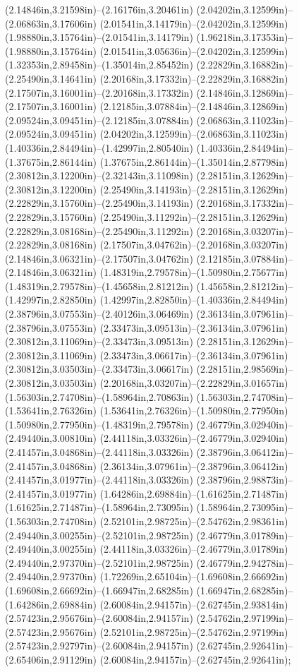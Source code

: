 (2.14846in,3.21598in)--(2.16176in,3.20461in) (2.04202in,3.12599in)--(2.06863in,3.17606in) (2.01541in,3.14179in)--(2.04202in,3.12599in) (1.98880in,3.15764in)--(2.01541in,3.14179in) (1.96218in,3.17353in)--(1.98880in,3.15764in) (2.01541in,3.05636in)--(2.04202in,3.12599in) (1.32353in,2.89458in)--(1.35014in,2.85452in) (2.22829in,3.16882in)--(2.25490in,3.14641in) (2.20168in,3.17332in)--(2.22829in,3.16882in) (2.17507in,3.16001in)--(2.20168in,3.17332in) (2.14846in,3.12869in)--(2.17507in,3.16001in) (2.12185in,3.07884in)--(2.14846in,3.12869in) (2.09524in,3.09451in)--(2.12185in,3.07884in) (2.06863in,3.11023in)--(2.09524in,3.09451in) (2.04202in,3.12599in)--(2.06863in,3.11023in) (1.40336in,2.84494in)--(1.42997in,2.80540in) (1.40336in,2.84494in)--(1.37675in,2.86144in) (1.37675in,2.86144in)--(1.35014in,2.87798in) (2.30812in,3.12200in)--(2.32143in,3.11098in) (2.28151in,3.12629in)--(2.30812in,3.12200in) (2.25490in,3.14193in)--(2.28151in,3.12629in) (2.22829in,3.15760in)--(2.25490in,3.14193in) (2.20168in,3.17332in)--(2.22829in,3.15760in) (2.25490in,3.11292in)--(2.28151in,3.12629in) (2.22829in,3.08168in)--(2.25490in,3.11292in) (2.20168in,3.03207in)--(2.22829in,3.08168in) (2.17507in,3.04762in)--(2.20168in,3.03207in) (2.14846in,3.06321in)--(2.17507in,3.04762in) (2.12185in,3.07884in)--(2.14846in,3.06321in) (1.48319in,2.79578in)--(1.50980in,2.75677in) (1.48319in,2.79578in)--(1.45658in,2.81212in) (1.45658in,2.81212in)--(1.42997in,2.82850in) (1.42997in,2.82850in)--(1.40336in,2.84494in) (2.38796in,3.07553in)--(2.40126in,3.06469in) (2.36134in,3.07961in)--(2.38796in,3.07553in) (2.33473in,3.09513in)--(2.36134in,3.07961in) (2.30812in,3.11069in)--(2.33473in,3.09513in) (2.28151in,3.12629in)--(2.30812in,3.11069in) (2.33473in,3.06617in)--(2.36134in,3.07961in) (2.30812in,3.03503in)--(2.33473in,3.06617in) (2.28151in,2.98569in)--(2.30812in,3.03503in) (2.20168in,3.03207in)--(2.22829in,3.01657in) (1.56303in,2.74708in)--(1.58964in,2.70863in) (1.56303in,2.74708in)--(1.53641in,2.76326in) (1.53641in,2.76326in)--(1.50980in,2.77950in) (1.50980in,2.77950in)--(1.48319in,2.79578in) (2.46779in,3.02940in)--(2.49440in,3.00810in) (2.44118in,3.03326in)--(2.46779in,3.02940in) (2.41457in,3.04868in)--(2.44118in,3.03326in) (2.38796in,3.06412in)--(2.41457in,3.04868in) (2.36134in,3.07961in)--(2.38796in,3.06412in) (2.41457in,3.01977in)--(2.44118in,3.03326in) (2.38796in,2.98873in)--(2.41457in,3.01977in) (1.64286in,2.69884in)--(1.61625in,2.71487in) (1.61625in,2.71487in)--(1.58964in,2.73095in) (1.58964in,2.73095in)--(1.56303in,2.74708in) (2.52101in,2.98725in)--(2.54762in,2.98361in) (2.49440in,3.00255in)--(2.52101in,2.98725in) (2.46779in,3.01789in)--(2.49440in,3.00255in) (2.44118in,3.03326in)--(2.46779in,3.01789in) (2.49440in,2.97370in)--(2.52101in,2.98725in) (2.46779in,2.94278in)--(2.49440in,2.97370in) (1.72269in,2.65104in)--(1.69608in,2.66692in) (1.69608in,2.66692in)--(1.66947in,2.68285in) (1.66947in,2.68285in)--(1.64286in,2.69884in) (2.60084in,2.94157in)--(2.62745in,2.93814in) (2.57423in,2.95676in)--(2.60084in,2.94157in) (2.54762in,2.97199in)--(2.57423in,2.95676in) (2.52101in,2.98725in)--(2.54762in,2.97199in) (2.57423in,2.92797in)--(2.60084in,2.94157in) (2.62745in,2.92641in)--(2.65406in,2.91129in) (2.60084in,2.94157in)--(2.62745in,2.92641in);
